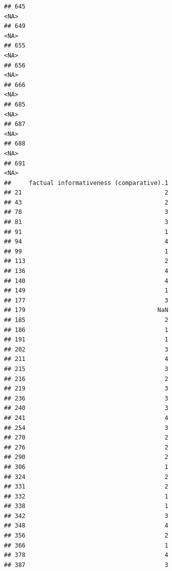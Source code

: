 \documentclass[
]{article}
\begin{document}
\begin{verbatim}
## 645                                                                         <NA>
## 649                                                                         <NA>
## 655                                                                         <NA>
## 656                                                                         <NA>
## 666                                                                         <NA>
## 685                                                                         <NA>
## 687                                                                         <NA>
## 688                                                                         <NA>
## 691                                                                         <NA>
##     factual informativeness (comparative).1
## 21                                        2
## 43                                        2
## 78                                        3
## 81                                        3
## 91                                        1
## 94                                        4
## 99                                        1
## 113                                       2
## 136                                       4
## 140                                       4
## 149                                       1
## 177                                       3
## 179                                     NaN
## 185                                       2
## 186                                       1
## 191                                       1
## 202                                       3
## 211                                       4
## 215                                       3
## 216                                       2
## 219                                       3
## 236                                       3
## 240                                       3
## 241                                       4
## 254                                       3
## 270                                       2
## 276                                       2
## 290                                       2
## 306                                       1
## 324                                       2
## 331                                       2
## 332                                       1
## 338                                       1
## 342                                       3
## 348                                       4
## 356                                       2
## 366                                       1
## 378                                       4
## 387                                       3

\end{verbatim}
\end{document}
